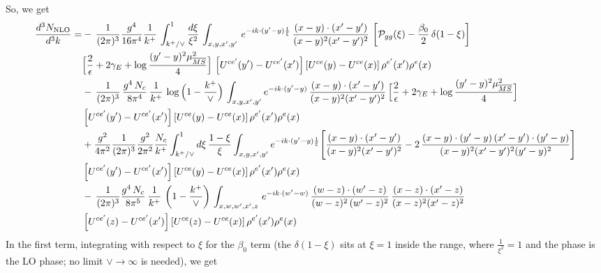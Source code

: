 \documentclass[9pt]{article}
\numberwithin{equation}{section}
\begin{document}
So, we get
\begin{align}
\frac{d^{3}N_{\rm NLO}}{d^{3}k}=&-\,\frac{1}{(2\pi)^{3}}\frac{g^{4}}{16\pi^{4}}\frac{1}{k^{+}}\,\int_{k^{+}/\vee}^{1}\frac{d\xi}{\xi^{2}}\,\int_{x,y,x',y'}\,e^{-ik\cdot(y'-y)\frac{1}{\xi}}\,\frac{(x-y)\cdot(x'-y')}{(x-y)^{2}(x'-y')^{2}}\,\left[\mathcal{P}_{gg}(\xi)-\frac{\beta_{0}}{2}\,\delta(1-\xi)\right]\notag \\ & \Big[\frac{2}{\epsilon}+2\gamma_{E}+\log\frac{(y'-y)^{2}\mu^{2}_{\overline{MS}}}{4}\Big]\,\left[U^{ce'}(y')-U^{ce'}(x')\right]\left[U^{ce}(y)-U^{ce}(x)\right]\rho^{e'}(x')\rho^{e}(x)\notag\\&
-\,\frac{1}{(2\pi)^{3}}\,\frac{g^{4}\,N_{c}}{8\pi^{4}}\,\frac{1}{k^{+}}\,\log\Big(1-\frac{k^{+}}{\vee}\Big)\,\int_{x,y,x',y'}e^{-ik\cdot(y'-y)}\,\frac{(x-y)\cdot(x'-y')}{(x-y)^{2}(x'-y')^{2}}\,\Big[\frac{2}{\epsilon}+2\gamma_{E}+\log\frac{(y'-y)^{2}\mu^{2}_{\overline{MS}}}{4}\Big]\notag \\ & \left[U^{ce'}(y')-U^{ce'}(x')\right]\left[U^{ce}(y)-U^{ce}(x)\right]\rho^{e'}(x')\rho^{e}(x)\notag\\
&+\frac{g^{2}}{4\pi^{2}}\frac{1}{(2\pi)^{3}}\frac{g^{2}}{2\pi^{2}}\frac{N_{c}}{k^{+}}\int_{k^{+}/\vee}^{1}d\xi\,\frac{1-\xi}{\xi}\int_{x,y,x',y'}e^{-ik\cdot(y'-y)\frac{1}{\xi}}\Bigg[\frac{(x-y)\cdot(x'-y')}{(x-y)^{2}(x'-y')^{2}}-2\,\frac{(x-y)\cdot(y'-y)\,(x'-y')\cdot(y'-y)}{(x-y)^{2}(x'-y')^{2}(y'-y)^{2}}\Bigg]\notag \\ & \left[U^{ce'}(y')-U^{ce'}(x')\right]\left[U^{ce}(y)-U^{ce}(x)\right]\rho^{e'}(x')\rho^{e}(x) \notag \\ & -\,\frac{1}{(2\pi)^{3}}\frac{g^{4}\,N_{c}}{8\pi^{5}}\,\frac{1}{k^{+}}\, \left(1-\frac{k^{+}}{\vee}\right)\,\int_{x,w,w',x',z}\,e^{-ik\cdot(w'-w)}\,\frac{(w-z)\cdot (w'-z)}{(w-z)^{2}\, (w'-z)^{2}}\,\frac{(x-z)\cdot(x'-z)}{(x-z)^{2}(x'-z)^{2}}\notag \\ & \left[U^{ce'}(z)-U^{ce'}(x')\right]\left[U^{ce}(z)-U^{ce}(x)\right]\rho^{e'}(x')\rho^{e}(x)
\end{align}
In the first term, integrating with respect to $\xi$ for the $\beta_{0}$ term (the
$\delta(1-\xi)$ sits at $\xi=1$ inside the range, where $\frac{1}{\xi^{2}}=1$ and the phase is
the LO phase; {\color{red}no limit $\vee\to\infty$ is needed}), we get
\end{document}
